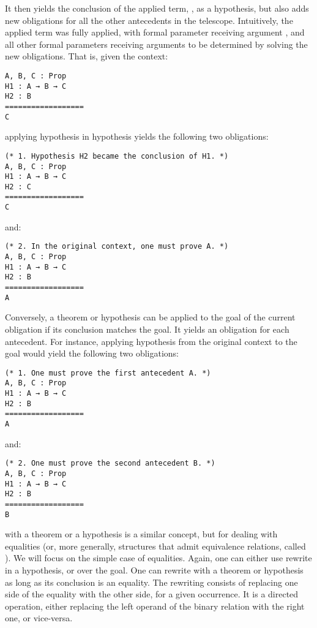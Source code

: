 It then yields the conclusion of the applied term, , as a
hypothesis, but also adds new obligations for all the other antecedents in the
telescope.  Intuitively, the applied term  was fully applied, with
formal parameter  receiving argument , and all other
formal parameters receiving arguments to be determined by solving the new
obligations.  That is, given the context:

\begin{verbatim}
A, B, C : Prop
H1 : A → B → C
H2 : B
==================
C
\end{verbatim}

\noindent applying hypothesis  in hypothesis  yields
the following two obligations:

\begin{verbatim}
(* 1. Hypothesis H2 became the conclusion of H1. *)
A, B, C : Prop
H1 : A → B → C
H2 : C
==================
C
\end{verbatim}

and:

\begin{verbatim}
(* 2. In the original context, one must prove A. *)
A, B, C : Prop
H1 : A → B → C
H2 : B
==================
A
\end{verbatim}

Conversely, a theorem or hypothesis can be applied to the goal of the current
obligation if its conclusion matches the goal.  It yields an obligation for each
antecedent.  For instance, applying hypothesis  from the original
context to the goal would yield the following two obligations:

\begin{verbatim}
(* 1. One must prove the first antecedent A. *)
A, B, C : Prop
H1 : A → B → C
H2 : B
==================
A
\end{verbatim}

and:

\begin{verbatim}
(* 2. One must prove the second antecedent B. *)
A, B, C : Prop
H1 : A → B → C
H2 : B
==================
B
\end{verbatim}

 with a theorem or a hypothesis is a similar concept, but for
dealing with equalities (or, more generally, structures that admit equivalence
relations, called ).  We will focus on the simple case of
equalities.  Again, one can either use rewrite in a hypothesis, or over the
goal.  One can rewrite with a theorem or hypothesis as long as its conclusion is
an equality.  The rewriting consists of replacing one side of the equality with
the other side, for a given occurrence.  It is a directed operation, either
replacing the left operand of the binary relation with the right one, or
vice-versa.

